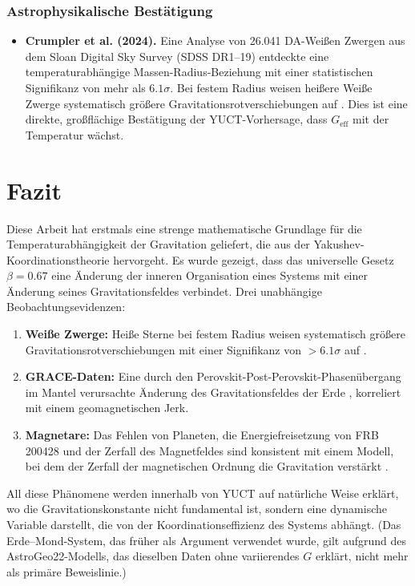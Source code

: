 \documentclass[12pt]{article}
\theoremstyle{remark}
\begin{document}
	\subsubsection*{Astrophysikalische Bestätigung}
	
	\begin{itemize}
		\item \textbf{Crumpler et al. (2024).} Eine Analyse von 26.041 DA-Weißen Zwergen aus dem Sloan Digital Sky Survey (SDSS DR1–19) entdeckte eine temperaturabhängige Massen-Radius-Beziehung mit einer statistischen Signifikanz von mehr als $6.1\sigma$. Bei festem Radius weisen heißere Weiße Zwerge systematisch größere Gravitationsrotverschiebungen auf \cite{Crumpler2024}. Dies ist eine direkte, großflächige Bestätigung der YUCT-Vorhersage, dass $G_{\mathrm{eff}}$ mit der Temperatur wächst.
	\end{itemize}
	
	\section{Fazit}
	\label{sec:conclusion}
	
	Diese Arbeit hat erstmals eine strenge mathematische Grundlage für die Temperaturabhängigkeit der Gravitation geliefert, die aus der Yakushev-Koordinationstheorie hervorgeht. Es wurde gezeigt, dass das universelle Gesetz $\beta = 0.67$ eine Änderung der inneren Organisation eines Systems mit einer Änderung seines Gravitationsfeldes verbindet. Drei unabhängige Beobachtungsevidenzen:
	\begin{enumerate}
		\item \textbf{Weiße Zwerge:} Heiße Sterne bei festem Radius weisen systematisch größere Gravitationsrotverschiebungen mit einer Signifikanz von $>6.1\sigma$ auf \cite{Crumpler2024}.
		\item \textbf{GRACE-Daten:} Eine durch den Perovskit-Post-Perovskit-Phasenübergang im Mantel verursachte Änderung des Gravitationsfeldes der Erde \cite{Rosat2025}, korreliert mit einem geomagnetischen Jerk.
		\item \textbf{Magnetare:} Das Fehlen von Planeten, die Energiefreisetzung von FRB 200428 und der Zerfall des Magnetfeldes sind konsistent mit einem Modell, bei dem der Zerfall der magnetischen Ordnung die Gravitation verstärkt \cite{Kaspi2017, Geng2020}.
	\end{enumerate}
	All diese Phänomene werden innerhalb von YUCT auf natürliche Weise erklärt, wo die Gravitationskonstante nicht fundamental ist, sondern eine dynamische Variable darstellt, die von der Koordinationseffizienz des Systems abhängt. (Das Erde–Mond-System, das früher als Argument verwendet wurde, gilt aufgrund des AstroGeo22-Modells, das dieselben Daten ohne variierendes $G$ erklärt, nicht mehr als primäre Beweislinie.)
	
\end{document}
